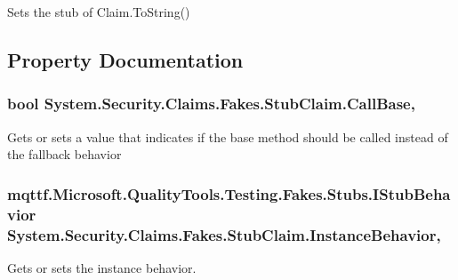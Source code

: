 Sets the stub of Claim.\-To\-String()



\subsection{Property Documentation}
\hypertarget{class_system_1_1_security_1_1_claims_1_1_fakes_1_1_stub_claim_a11c17d22274e8919ede43bc156da9b13}{
\subsubsection[{Call\-Base}]{\setlength{\rightskip}{0pt plus 5cm}bool System.\-Security.\-Claims.\-Fakes.\-Stub\-Claim.\-Call\-Base\hspace{0.3cm}{\ttfamily [get]}, {\ttfamily [set]}}}\label{class_system_1_1_security_1_1_claims_1_1_fakes_1_1_stub_claim_a11c17d22274e8919ede43bc156da9b13}


Gets or sets a value that indicates if the base method should be called instead of the fallback behavior

\hypertarget{class_system_1_1_security_1_1_claims_1_1_fakes_1_1_stub_claim_aedf0263792637d4eb0680549e7ce88d4}{
\subsubsection[{Instance\-Behavior}]{\setlength{\rightskip}{0pt plus 5cm}mqttf.\-Microsoft.\-Quality\-Tools.\-Testing.\-Fakes.\-Stubs.\-I\-Stub\-Behavior System.\-Security.\-Claims.\-Fakes.\-Stub\-Claim.\-Instance\-Behavior\hspace{0.3cm}{\ttfamily [get]}, {\ttfamily [set]}}}\label{class_system_1_1_security_1_1_claims_1_1_fakes_1_1_stub_claim_aedf0263792637d4eb0680549e7ce88d4}


Gets or sets the instance behavior.

